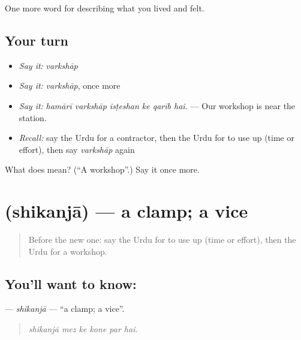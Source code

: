 \begin{grammarlens}[title={What you've built}]
One more word for describing what you lived and felt.
\end{grammarlens}

\subsection*{Your turn}
\begin{itemize}
\raggedright
  \item \emph{Say it:} \emph{varkshāp}
  \item \emph{Say it:} \emph{varkshāp}, once more
  \item \emph{Say it:} \emph{hamārī varkshāp isṭeshan ke qarīb hai.} — Our workshop is near the station.
  \item \emph{Recall:} say the Urdu for a contractor, then the Urdu for to use up (time or effort), then say \emph{varkshāp} again
\end{itemize}

\begin{tcolorbox}[breakable,colback=teal!4,colframe=teal!35!black,title={Before you move on}]
What does  mean? (\textquotedblleft{}A workshop\textquotedblright{}.) Say it once more.
\end{tcolorbox}
\section[\texorpdfstring{\ur{شکنجہ} (shikanjā)}{شکنجہ (shikanjā)}]{ (shikanjā) — a clamp; a vice}

\label{lesson:UR-C496-shikanja}



\begin{quote}
Before the new one: say the Urdu for to use up (time or effort), then the Urdu for a workshop.
\end{quote}

\subsection*{You'll want to know: }
\textbf{} — \emph{shikanjā} — \textquotedblleft{}a clamp; a vice\textquotedblright{}.

\begin{quote}
     
\end{quote}

\begin{quote}
\emph{shikanjā mez ke kone par hai.}
\end{quote}


